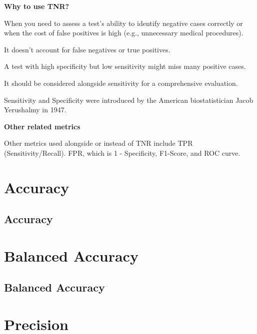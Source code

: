 \textbf{Why to use TNR?}

When you need to assess a test's ability to identify negative cases correctly or when the cost of false positives is high (e.g., unnecessary medical procedures).

{
\item It doesn't account for false negatives or true positives.
\item A test with high specificity but low sensitivity might miss many positive cases.
\item It should be considered alongside sensitivity for a comprehensive evaluation.
}

\clearpage
\thispagestyle{customstyle}

{
    Sensitivity and Specificity were introduced by the American biostatistician Jacob Yerushalmy in 1947.
}

\textbf{Other related metrics}

Other metrics used alongside or instead of TNR include TPR (Sensitivity/Recall). FPR, which is 1 - Specificity, F1-Score, and ROC curve.
\clearpage
\thispagestyle{classificationstyle}
\section{Accuracy}
\subsection{Accuracy}

\clearpage
\thispagestyle{classificationstyle}
\section{Balanced Accuracy}
\subsection{Balanced Accuracy}

\clearpage
\thispagestyle{classificationstyle}
\section{Precision}
